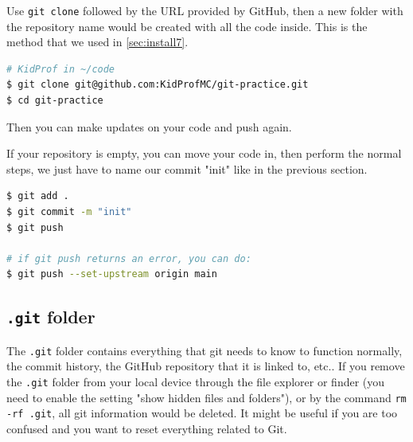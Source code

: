 Use \texttt{git clone} followed by the URL provided by GitHub, then a new folder with the repository name would be created with all the code inside. This is the method that we used in \cref{sec:install7}.

\begin{lstlisting}[language=bash]
# KidProf in ~/code
$ git clone git@github.com:KidProfMC/git-practice.git
$ cd git-practice
\end{lstlisting}

Then you can make updates on your code and push again.

If your repository is empty, you can move your code in, then perform the normal steps, we just have to name our commit "init" like in the previous section.

\begin{lstlisting}[language=bash]
$ git add .
$ git commit -m "init"
$ git push

# if git push returns an error, you can do:
$ git push --set-upstream origin main
\end{lstlisting}

\subsection{\texttt{.git} folder}

The \texttt{.git} folder contains everything that git needs to know to function normally, the commit history, the GitHub repository that it is linked to, etc.. If you remove the \texttt{.git} folder from your local device through the file explorer or finder (you need to enable the setting "show hidden files and folders"), or by the command \texttt{rm -rf .git}, all git information would be deleted. It might be useful if you are too confused and you want to reset everything related to Git.

